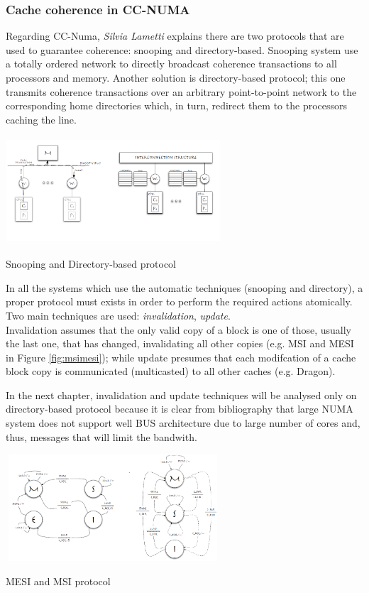 \documentclass[a4paper,10pt]{article}
\makeatletter
\newenvironment{figurehere}{\def\@captype{figure}\vspace{2ex}}{\vspace{2ex}}
\makeatother
\begin{document}
\begin{multicols}{2}
\subsubsection{Cache coherence in CC-NUMA}
Regarding CC-Numa, \emph{Silvia Lametti} \cite{lametti} explains there are two protocols that are used to guarantee coherence: snooping and directory-based. Snooping system use a totally ordered network to directly broadcast coherence transactions to all processors and memory. Another solution is directory-based protocol; this one transmits coherence transactions over an arbitrary point-to-point network to the corresponding home directories which, in turn, redirect them to the processors caching the line. 

\begin{figurehere}
 \centering
 \includegraphics[width=8cm, height=4cm]{./eps/SnoopeDir.png}
 \caption{Snooping and Directory-based protocol}
 \label{fig:s&d}
\end{figurehere}

In all the systems which use the automatic techniques (snooping and directory), a proper protocol must exists in order to perform the required actions atomically. Two main techniques are used: \emph{invalidation}, \emph{update}.\\
Invalidation assumes that the only valid copy of a block is one of those, usually the last one, that has changed, invalidating all other copies (e.g. MSI and MESI in Figure \ref{fig:msimesi}); while update presumes that each modifcation of a cache block copy is communicated (multicasted) to all other caches (e.g. Dragon).\par
\parindent 10mm In the next chapter, invalidation and update techniques will be analysed only on directory-based protocol because it is clear from bibliography that large NUMA system does not support well BUS architecture due to large number of cores and, thus, messages that will limit the bandwith.

\begin{figurehere}
 \centering
 \includegraphics[width=8cm, height=4cm]{./eps/msimesi.png}
 \caption{MESI and MSI protocol}
 \label{fig:msimesi}
\end{figurehere}


\end{multicols}
\end{document}
